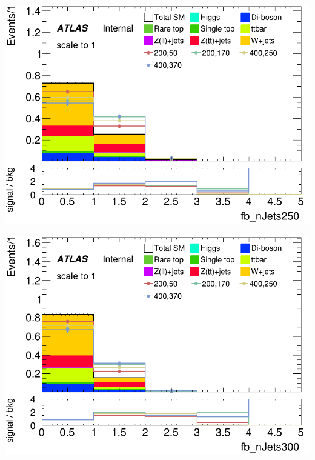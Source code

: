 \documentclass[usenames,dvipsnames]{beamer}
\begin{document}
\begin{frame}
    \begin{minipage}{0.32\textwidth}
        \centering
        \includegraphics[width=\textwidth]{graphics/LH_met_sig/LH_fb_nJets250_norm.png}
    \end{minipage}
    \hfill
    \begin{minipage}{0.32\textwidth}
        \centering
        \includegraphics[width=\textwidth]{graphics/LH_met_sig/LH_fb_nJets300_norm.png}
    \end{minipage}
    \hfill
    \begin{minipage}{0.32\textwidth}
        \centering

\end{minipage}
\end{frame}
\end{document}
